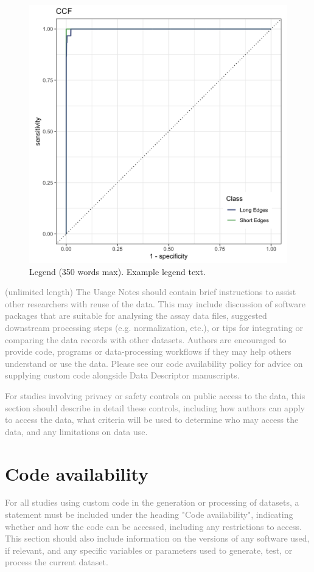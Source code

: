 \documentclass[fleqn,10pt]{wlscirep}
\begin{document}
\begin{figure}[ht]
\centering
\includegraphics[width=0.5\linewidth]{ccf_ROC.png}
\caption{Legend (350 words max). Example legend text.}
\label{fig: ccf_ROC}
\end{figure}

\textcolor{gray}{(unlimited length) The Usage Notes should contain brief instructions to assist other researchers with reuse of the data. This may include discussion of software packages that are suitable for analysing the assay data files, suggested downstream processing steps (e.g. normalization, etc.), or tips for integrating or comparing the data records with other datasets. Authors are encouraged to provide code, programs or data-processing workflows if they may help others understand or use the data. Please see our code availability policy for advice on supplying custom code alongside Data Descriptor manuscripts.}

\textcolor{gray}{For studies involving privacy or safety controls on public access to the data, this section should describe in detail these controls, including how authors can apply to access the data, what criteria will be used to determine who may access the data, and any limitations on data use.}

\section*{Code availability}

\textcolor{gray}{For all studies using custom code in the generation or processing of datasets, a statement must be included under the heading "Code availability", indicating whether and how the code can be accessed, including any restrictions to access. This section should also include information on the versions of any software used, if relevant, and any specific variables or parameters used to generate, test, or process the current dataset.}
\end{document}
